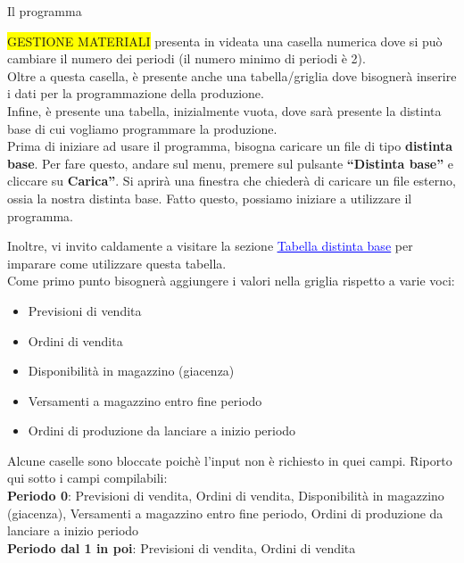 \documentclass[12pt,twoside]{report}
\begin{document}
\hypertarget{inputProduzione}{Il programma} \colorbox{yellow}{GESTIONE MATERIALI} presenta in videata una casella numerica dove si può cambiare il numero dei periodi (il numero minimo di periodi è 2).\\
Oltre a questa casella, è presente anche una tabella/griglia dove bisognerà inserire i dati per la programmazione della produzione.\\
Infine, è presente una tabella, inizialmente vuota, dove sarà presente la distinta base di cui vogliamo programmare la produzione.\\

Prima di iniziare ad usare il programma, bisogna caricare un file di tipo \textbf{distinta base}. Per fare questo, andare sul menu, premere sul pulsante \textbf{“Distinta base”} e cliccare su \textbf{Carica”}. Si aprirà una finestra che chiederà di caricare un file esterno, ossia la nostra distinta base. Fatto questo, possiamo iniziare a utilizzare il programma.

Inoltre, vi invito caldamente a visitare la sezione \hyperlink{tabDistintaBase}{\textcolor{blue}{\underline{Tabella distinta base}}} per imparare come utilizzare questa tabella.\\

Come primo punto bisognerà aggiungere i valori nella griglia rispetto a varie voci:
\begin{itemize}
	
	\item Previsioni di vendita
	\item Ordini di vendita
	\item Disponibilità in magazzino (giacenza)
	\item Versamenti a magazzino entro fine periodo
	\item Ordini di produzione da lanciare a inizio periodo
	      	
\end{itemize}

Alcune caselle sono bloccate poichè l'input non è richiesto in quei campi.
Riporto qui sotto i campi compilabili:\\

\textbf{Periodo 0}: 
Previsioni di vendita,
Ordini di vendita,
Disponibilità in magazzino (giacenza),
Versamenti a magazzino entro fine periodo,
Ordini di produzione da lanciare a inizio periodo\\

\textbf{Periodo dal 1 in poi}:
Previsioni di vendita,
Ordini di vendita\\
\end{document}
